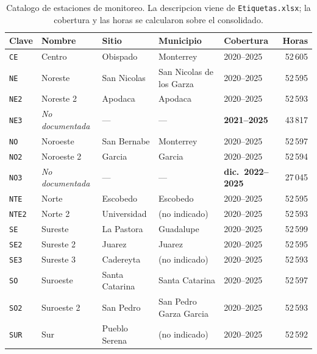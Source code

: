 \begin{table}[pos=t]
  \centering
  \caption{Catalogo de estaciones de monitoreo. La descripcion viene de
    \texttt{Etiquetas.xlsx}; la cobertura y las horas se calcularon sobre el
    consolidado.}
  \label{tab:dic-estaciones}
  \small
  \begin{tabular}{lllllr}
    \toprule
    Clave & Nombre & Sitio & Municipio & Cobertura & Horas \\
    \midrule
    \texttt{CE}   & Centro                & Obispado       & Monterrey                & 2020--2025                & 52\,605 \\
    \texttt{NE}   & Noreste               & San Nicolas    & San Nicolas de los Garza & 2020--2025                & 52\,595 \\
    \texttt{NE2}  & Noreste 2             & Apodaca        & Apodaca                  & 2020--2025                & 52\,593 \\
    \texttt{NE3}  & \emph{No documentada} & ---            & ---                      & \textbf{2021--2025}       & 43\,817 \\
    \texttt{NO}   & Noroeste              & San Bernabe    & Monterrey                & 2020--2025                & 52\,597 \\
    \texttt{NO2}  & Noroeste 2            & Garcia         & Garcia                   & 2020--2025                & 52\,594 \\
    \texttt{NO3}  & \emph{No documentada} & ---            & ---                      & \textbf{dic.\ 2022--2025} & 27\,045 \\
    \texttt{NTE}  & Norte                 & Escobedo       & Escobedo                 & 2020--2025                & 52\,595 \\
    \texttt{NTE2} & Norte 2               & Universidad    & (no indicado)            & 2020--2025                & 52\,593 \\
    \texttt{SE}   & Sureste               & La Pastora     & Guadalupe                & 2020--2025                & 52\,599 \\
    \texttt{SE2}  & Sureste 2             & Juarez         & Juarez                   & 2020--2025                & 52\,595 \\
    \texttt{SE3}  & Sureste 3             & Cadereyta      & (no indicado)            & 2020--2025                & 52\,593 \\
    \texttt{SO}   & Suroeste              & Santa Catarina & Santa Catarina           & 2020--2025                & 52\,597 \\
    \texttt{SO2}  & Suroeste 2            & San Pedro      & San Pedro Garza Garcia   & 2020--2025                & 52\,593 \\
    \texttt{SUR}  & Sur                   & Pueblo Serena  & (no indicado)            & 2020--2025                & 52\,592 \\
    \bottomrule
  \end{tabular}
\end{table}

